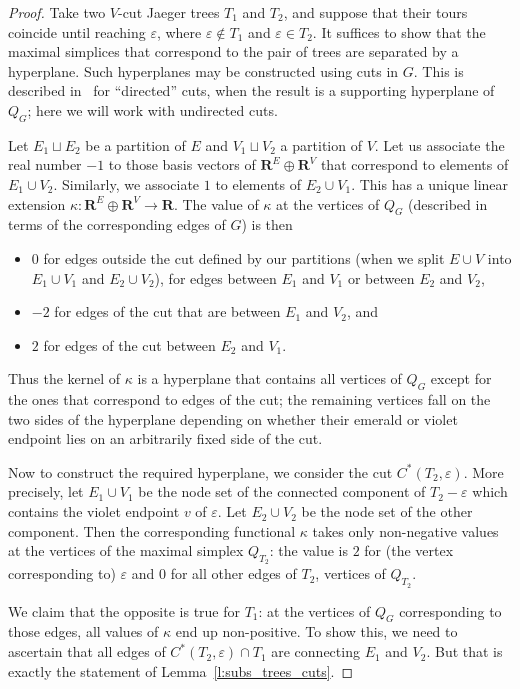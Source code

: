 \documentclass[ALCO,ThmDefs,Unicode,epreuves]{cedram}
\newcommand{\R}{\mathbf{R}}
\begin{document}
\begin{proof}
	Take two $V$-cut Jaeger trees $T_1$ and $T_2$, and suppose that their tours coincide until reaching $\varepsilon$, where $\varepsilon\notin T_1$ and $\varepsilon\in T_2$. It suffices to show that the maximal simplices that correspond to the pair of trees are separated by a hyperplane. Such hyperplanes may be constructed using cuts in $G$. This is described in~\cite[Section~3]{KP_Ehrhart} for ``directed'' cuts, when the result is a supporting hyperplane of $Q_G$; here we will work with undirected cuts.
	
	Let $E_1\sqcup E_2$ be a partition of $E$ and $V_1\sqcup V_2$ a partition of $V$. Let us associate the real number $-1$ to those basis vectors of $\R^E\oplus\R^V$ that correspond to elements of $E_1\cup V_2$. Similarly, we associate $1$ to elements of $E_2\cup V_1$. This has a unique linear extension $\kappa\colon\R^E\oplus\R^V\to\R$. The value of $\kappa$ at the vertices of $Q_G$ (described in terms of the corresponding edges of $G$) is then
	\begin{itemize}
		\item $0$ for edges outside the cut defined by our partitions (when we split $E\cup V$ into $E_1\cup V_1$ and $E_2\cup V_2$), \ie for edges between $E_1$ and $V_1$ or between $E_2$ and $V_2$,
		\item $-2$ for edges of the cut that are between $E_1$ and $V_2$, and
		\item $2$ for edges of the cut between $E_2$ and $V_1$.
	\end{itemize}
	Thus the kernel of $\kappa$ is a hyperplane that contains all vertices of $Q_G$ except for the ones that correspond to edges of the cut; the remaining vertices fall on the two sides of the hyperplane depending on whether their emerald or violet endpoint lies on an arbitrarily fixed side of the cut.
	
	Now to construct the required hyperplane, we consider the cut $C^*(T_2,\varepsilon)$. More precisely, let $E_1\cup V_1$ be the node set of the connected component of $T_2-\varepsilon$ which contains the violet endpoint $v$ of $\varepsilon$. Let $E_2\cup V_2$ be the node set of the other component. Then the corresponding functional $\kappa$ takes only non-negative values at the vertices of the maximal simplex $Q_{T_2}$: the value is $2$ for (the vertex corresponding to) $\varepsilon$ and $0$ for all other edges of $T_2$, \ie vertices of $Q_{T_2}$. 
	
	We claim that the opposite is true for $T_1$: at the vertices of $Q_G$ corresponding to those edges, all values of $\kappa$ end up non-positive. To show this, we need to ascertain that all edges of $C^*(T_2,\varepsilon)\cap T_1$ are connecting $E_1$ and $V_2$. But that is exactly the statement of Lemma~\ref{l:subs_trees_cuts}. 
\end{proof}
\end{document}
